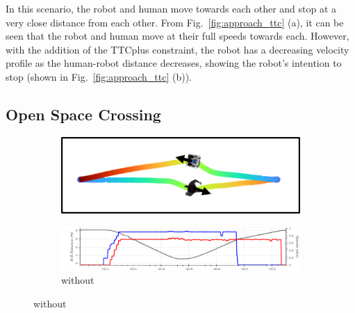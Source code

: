 In this scenario, the robot and human move towards each other and stop at a very close distance from each other. From Fig.~\ref{fig:approach_ttc} (a), it can be seen that the robot and human move at their full speeds towards each. However, with the addition of the TTCplus constraint, the robot has a decreasing velocity profile as the human-robot distance decreases, showing the robot's intention to stop (shown in Fig.~\ref{fig:approach_ttc} (b)).

\subsection{Open Space Crossing}
\begin{figure}[H]
\centering
\begin{subfigure}{0.5\columnwidth}
  \includegraphics[width=\textwidth]{images/appendix/ttc/wide/without.png}
\end{subfigure}
\vspace{0.5cm}
\begin{subfigure}{0.8\columnwidth}
  \includegraphics[width=\textwidth]{images/appendix/ttc/wide/wide_without1.png}
  \caption{without}
\end{subfigure}


\end{figure}
